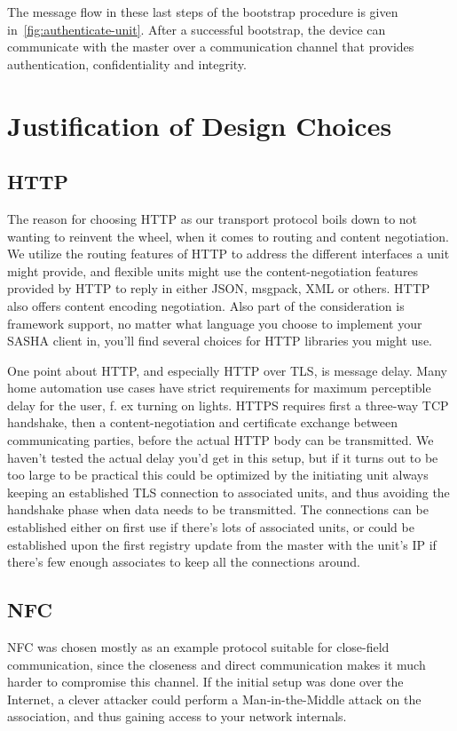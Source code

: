 The message flow in these last steps of the bootstrap procedure is given in~\autoref{fig:authenticate-unit}. After a successful bootstrap, the device can communicate with the master over a communication channel that provides authentication, confidentiality and integrity.
\section{Justification of Design Choices}

\subsection{HTTP}
The reason for choosing HTTP as our transport protocol boils down to not wanting to reinvent the wheel, when it comes to routing and content negotiation. We utilize the routing features of HTTP to address the different interfaces a unit might provide, and flexible units might use the content-negotiation features provided by HTTP to reply in either JSON, msgpack, XML or others. HTTP also offers content encoding negotiation. Also part of the consideration is framework support, no matter what language you choose to implement your SASHA client in, you'll find several choices for HTTP libraries you might use.

One point about HTTP, and especially HTTP over TLS, is message delay. Many home automation use cases have strict requirements for maximum perceptible delay for the user, f. ex turning on lights. HTTPS requires first a three-way TCP handshake, then a content-negotiation and certificate exchange between communicating parties, before the actual HTTP body can be transmitted. We haven't tested the actual delay you'd get in this setup, but if it turns out to be too large to be practical this could be optimized by the initiating unit always keeping an established TLS connection to associated units, and thus avoiding the handshake phase when data needs to be transmitted. The connections can be established either on first use if there's lots of associated units, or could be established upon the first registry update from the master with the unit's IP if there's few enough associates to keep all the connections around.

\subsection{NFC}
NFC was chosen mostly as an example protocol suitable for close-field communication, since the closeness and direct communication makes it much harder to compromise this channel. If the initial setup was done over the Internet, a clever attacker could perform a Man-in-the-Middle attack on the association, and thus gaining access to your network internals.

